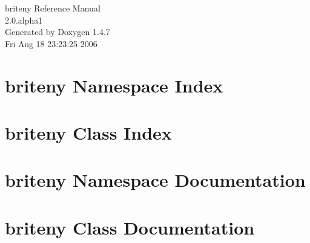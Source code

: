 \documentclass[a4paper]{book}
\begin{document}
\begin{titlepage}
\vspace*{7cm}
\begin{center}
{\Large briteny Reference Manual\\[1ex]\large 2.0.alpha1 }\\
\vspace*{1cm}
{\large Generated by Doxygen 1.4.7}\\
\vspace*{0.5cm}
{\small Fri Aug 18 23:23:25 2006}\\
\end{center}
\end{titlepage}
\clearemptydoublepage
{}
\tableofcontents
\clearemptydoublepage
{}
\chapter{briteny Namespace Index}

\chapter{briteny Class Index}

\chapter{briteny Namespace Documentation}


\chapter{briteny Class Documentation}


\printindex
\end{document}
